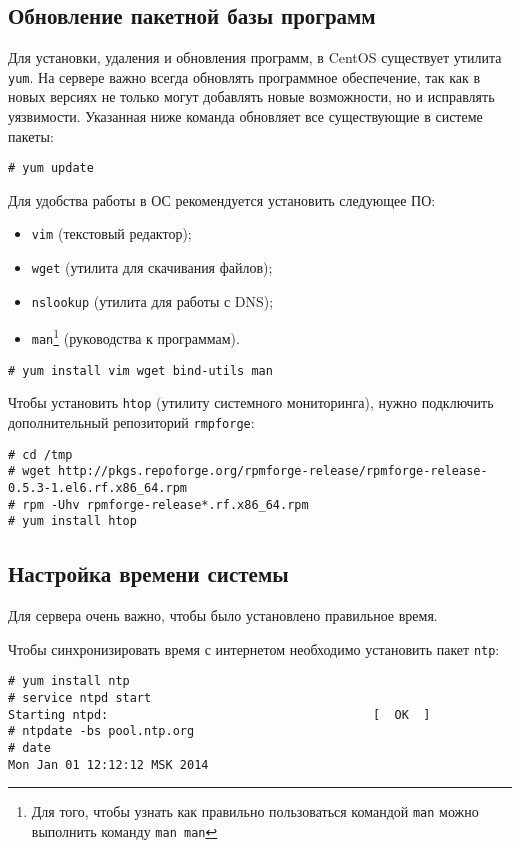 \subsection{Обновление пакетной базы программ}
Для установки, удаления и обновления программ, в CentOS существует утилита \texttt{yum}. 
На сервере важно всегда обновлять программное обеспечение, так как в новых версиях не только могут добавлять новые возможности, но и исправлять уязвимости.
Указанная ниже команда обновляет все существующие в системе пакеты:
\begin{lstlisting}
# yum update
\end{lstlisting}

Для удобства работы в ОС рекомендуется установить следующее ПО:
\begin{itemize}
\item \texttt{vim} (текстовый редактор);
\item \texttt{wget} (утилита для скачивания файлов);
\item \texttt{nslookup} (утилита для работы с DNS);
\item \texttt{man}\footnote{Для того, чтобы узнать как правильно пользоваться командой \texttt{man} можно выполнить команду \texttt{man man}} (руководства к программам).
\end{itemize}

\begin{lstlisting}
# yum install vim wget bind-utils man
\end{lstlisting}

Чтобы установить \texttt{htop} (утилиту системного мониторинга), нужно подключить дополнительный репозиторий \texttt{rmpforge}:
\begin{lstlisting}
# cd /tmp
# wget http://pkgs.repoforge.org/rpmforge-release/rpmforge-release-0.5.3-1.el6.rf.x86_64.rpm
# rpm -Uhv rpmforge-release*.rf.x86_64.rpm
# yum install htop
\end{lstlisting}

\subsection{Настройка времени системы}
Для сервера очень важно, чтобы было установлено правильное время.

Чтобы синхронизировать время с интернетом необходимо установить пакет \texttt{ntp}:
\begin{lstlisting}
# yum install ntp
# service ntpd start
Starting ntpd:                                     [  OK  ]
# ntpdate -bs pool.ntp.org
# date
Mon Jan 01 12:12:12 MSK 2014
\end{lstlisting}

